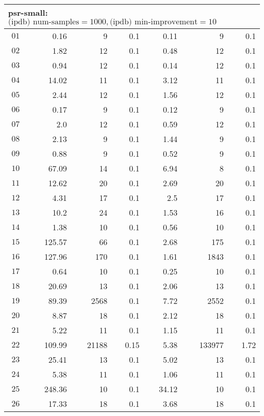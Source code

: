 \begin{longtable}{|c||r|r|r||r|r|r|}
\multicolumn{7}{|l|}{psr-small: $\text{(ipdb) num-samples}=1000,\text{(ipdb) min-improvement}=10$}\\\hline
$01$ & 0.16 & 9 & 0.1 &0.11 & 9 & 0.1 \\\hline
$02$ & 1.82 & 12 & 0.1 &0.48 & 12 & 0.1 \\\hline
$03$ & 0.94 & 12 & 0.1 &0.14 & 12 & 0.1 \\\hline
$04$ & 14.02 & 11 & 0.1 &3.12 & 11 & 0.1 \\\hline
$05$ & 2.44 & 12 & 0.1 &1.56 & 12 & 0.1 \\\hline
$06$ & 0.17 & 9 & 0.1 &0.12 & 9 & 0.1 \\\hline
$07$ & 2.0 & 12 & 0.1 &0.59 & 12 & 0.1 \\\hline
$08$ & 2.13 & 9 & 0.1 &1.44 & 9 & 0.1 \\\hline
$09$ & 0.88 & 9 & 0.1 &0.52 & 9 & 0.1 \\\hline
$10$ & 67.09 & 14 & 0.1 &6.94 & 8 & 0.1 \\\hline
$11$ & 12.62 & 20 & 0.1 &2.69 & 20 & 0.1 \\\hline
$12$ & 4.31 & 17 & 0.1 &2.5 & 17 & 0.1 \\\hline
$13$ & 10.2 & 24 & 0.1 &1.53 & 16 & 0.1 \\\hline
$14$ & 1.38 & 10 & 0.1 &0.56 & 10 & 0.1 \\\hline
$15$ & 125.57 & 66 & 0.1 &2.68 & 175 & 0.1 \\\hline
$16$ & 127.96 & 170 & 0.1 &1.61 & 1843 & 0.1 \\\hline
$17$ & 0.64 & 10 & 0.1 &0.25 & 10 & 0.1 \\\hline
$18$ & 20.69 & 13 & 0.1 &2.06 & 13 & 0.1 \\\hline
$19$ & 89.39 & 2568 & 0.1 &7.72 & 2552 & 0.1 \\\hline
$20$ & 8.87 & 18 & 0.1 &2.12 & 18 & 0.1 \\\hline
$21$ & 5.22 & 11 & 0.1 &1.15 & 11 & 0.1 \\\hline
$22$ & 109.99 & 21188 & 0.15 &5.38 & 133977 & 1.72 \\\hline
$23$ & 25.41 & 13 & 0.1 &5.02 & 13 & 0.1 \\\hline
$24$ & 5.38 & 11 & 0.1 &1.06 & 11 & 0.1 \\\hline
$25$ & 248.36 & 10 & 0.1 &34.12 & 10 & 0.1 \\\hline
$26$ & 17.33 & 18 & 0.1 &3.68 & 18 & 0.1 \\\hline

\end{longtable}
